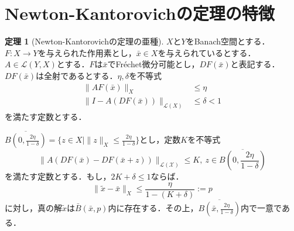 \documentclass[11pt,a4paper,titlepage]{jsreport}
\theoremstyle{definition}
\newtheorem{thm}{定理}
\begin{document}
\section{Newton-Kantorovichの定理の特徴\cite{r1}}
\begin{thm}[Newton-Kantorovichの定理の亜種]
  \label{thm:Newton-Kantorovichの定理の亜種}
  $X$と$Y$をBanach空間とする．$F:X\rightarrow Y$を与えられた作用素とし，$\bar{x}\in X$を与えられているとする．$A\in \mathcal{L}(Y,X)$とする．$F$は$\bar{x}$でFr\'{e}chet微分可能とし，$DF(\bar{x})$と表記する．$DF(\bar{x})$は全射であるとする．$\eta,\delta$を不等式
  \begin{align*}
    \|AF(\bar{x})\|_X &\leq \eta \\
    \|I-A(DF(\bar{x}))\|_{\mathcal{L}(X)} &\leq \delta < 1
  \end{align*}
  を満たす定数とする．

  $\overline{B(0,\frac{2\eta}{1-\delta})} = \{z\in X \mid \|z\|_X \leq \frac{2\eta}{1-\delta} \}$とし，定数$K$を不等式
  \begin{equation*}
    \|A(DF(\bar{x})-DF(\bar{x}+z))\|_\mathcal{{L}(X)} \leq K,\ z\in \overline{B\left(0,\frac{2\eta}{1-\delta}\right)}
  \end{equation*}
  を満たす定数とする．もし，$2K+\delta\leq 1$ならば．
  \begin{equation*}
    \|\tilde{x}-\bar{x}\|_X \leq \frac{\eta}{1-(K+\delta)} := p
  \end{equation*}
  に対し，真の解$\tilde{x}$は$\bar{B}(\bar{x},p)$内に存在する．その上，$\overline{B\left(\bar{x},\frac{2\eta}{1-\delta}\right)}$内で一意である．
\end{thm}
\end{document}
